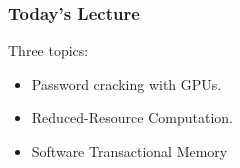 \begin{frame}
  \frametitle{Today's Lecture}



  Three topics:
  \begin{itemize}
    \item Password cracking with GPUs.
    \item Reduced-Resource Computation.
    \item Software Transactional Memory
  \end{itemize}~\\[1em]


\end{frame}



